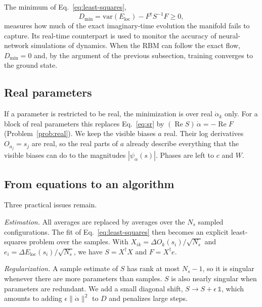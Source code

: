 \documentclass[aps,prb,preprint,amsmath,amssymb,nofootinbib,longbibliography]{revtex4-2}
\newcommand{\Eloc}{E_{\mathrm{loc}}}
\renewcommand{\Re}{\operatorname{Re}}
\begin{document}
The minimum of Eq.~\eqref{eq:least-squares},
\begin{equation}
  D_{\min} = \mathrm{var}(\Eloc) - F^\dagger S^{-1}F \ge 0,
  \label{eq:residual}
\end{equation}
measures how much of the exact imaginary-time evolution the manifold fails to capture. Its real-time
counterpart is used to monitor the accuracy of neural-network simulations of dynamics.\cite{schmitt2020} When the RBM can follow the
exact flow, $D_{\min} = 0$ and, by the argument of the previous subsection, training converges to the ground state.

\subsection{Real parameters}
\label{sec:real}

If a parameter is restricted to be real, the minimization is over real $\dot\alpha_k$ only. For a block of real
parameters this replaces Eq.~\eqref{eq:sr} by $(\Re S)\,\dot\alpha = -\Re F$ (Problem~\ref{prob:real}). We keep the
visible biases $a$ real. Their log derivatives $O_{a_j} = s_j$ are real, so the real parts of $a$ already describe
everything that the visible biases can do to the magnitudes $|\psi_\alpha(s)|$. Phases are left to $c$ and $W$.

\subsection{From equations to an algorithm}
\label{sec:approximations}

Three practical issues remain.

\emph{Estimation.} All averages are replaced by averages over the $N_s$ sampled configurations. The fit of
Eq.~\eqref{eq:least-squares} then becomes an explicit least-squares problem over the samples. With
$X_{ik} = \Delta O_k(s_i)/\sqrt{N_s}$ and $e_i = \Delta\Eloc(s_i)/\sqrt{N_s}$, we have $S = X^\dagger X$ and
$F = X^\dagger e$.

\emph{Regularization.} A sample estimate of $S$ has rank at most $N_s - 1$, so it is singular whenever there are more
parameters than samples. $S$ is also nearly singular when parameters are redundant. We add a small diagonal shift,
$S \to S + \epsilon\,\mathbb{1}$, which amounts to adding $\epsilon\|\dot\alpha\|^2$ to $D$ and penalizes large
steps.
\end{document}

